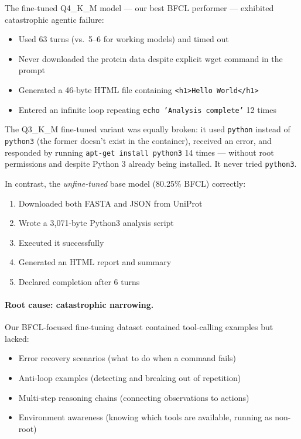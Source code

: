 \documentclass[11pt,a4paper]{article}
\begin{document}
The fine-tuned Q4\_K\_M model --- our best BFCL performer --- exhibited catastrophic agentic failure:
\begin{itemize}
\item Used 63 turns (vs.\ 5--6 for working models) and timed out
\item Never downloaded the protein data despite explicit wget command in the prompt
\item Generated a 46-byte HTML file containing \texttt{<h1>Hello World</h1>}
\item Entered an infinite loop repeating \texttt{echo 'Analysis complete'} 12 times
\end{itemize}

The Q3\_K\_M fine-tuned variant was equally broken: it used \texttt{python} instead of \texttt{python3} (the former doesn't exist in the container), received an error, and responded by running \texttt{apt-get install python3} 14 times --- without root permissions and despite Python 3 already being installed. It never tried \texttt{python3}.

In contrast, the \emph{unfine-tuned} base model (80.25\% BFCL) correctly:
\begin{enumerate}
\item Downloaded both FASTA and JSON from UniProt
\item Wrote a 3,071-byte Python3 analysis script
\item Executed it successfully
\item Generated an HTML report and summary
\item Declared completion after 6 turns
\end{enumerate}

\paragraph{Root cause: catastrophic narrowing.} Our BFCL-focused fine-tuning dataset contained tool-calling examples but lacked:
\begin{itemize}
\item Error recovery scenarios (what to do when a command fails)
\item Anti-loop examples (detecting and breaking out of repetition)
\item Multi-step reasoning chains (connecting observations to actions)
\item Environment awareness (knowing which tools are available, running as non-root)
\end{itemize}
\end{document}
